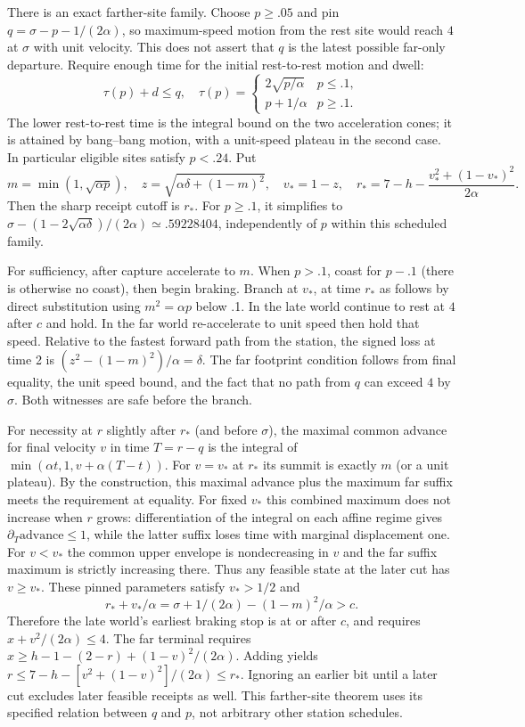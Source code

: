 \documentclass{article}
\begin{document}
There is an exact farther-site family. Choose $p\ge .05$ and pin
$q=\sigma-p-1/(2\alpha)$, so maximum-speed motion from the rest
site would reach $4$ at $\sigma$ with unit velocity. This does
not assert that $q$ is the latest possible far-only departure.
Require enough time for the initial rest-to-rest motion and dwell:
\[
 \tau(p)+d\le q,\quad
 \tau(p)=\begin{cases}2\sqrt{p/\alpha}&p\le .1,\\
 p+1/\alpha&p\ge .1.\end{cases}
\]
The lower rest-to-rest time is the integral bound on the two
acceleration cones; it is attained by bang--bang motion, with a
unit-speed plateau in the second case. In particular eligible
sites satisfy $p<.24$. Put
\[
 m=\min(1,\sqrt{\alpha p}),\quad z=\sqrt{\alpha\delta+(1-m)^2},
 \quad v_*=1-z,\quad
 r_* = 7-h-\frac{v_*^2+(1-v_*)^2}{2\alpha}.
\]
Then the sharp receipt cutoff is $r_*$. For $p\ge .1$, it
simplifies to $\sigma-(1-2\sqrt{\alpha\delta})/(2\alpha)
\simeq.59228404$, independently of $p$ within this scheduled
family.

For sufficiency, after capture accelerate to $m$. When $p>.1$,
coast for $p-.1$ (there is otherwise no coast), then begin
braking. Branch at $v_*$, at time $r_*$ as follows by direct
substitution using $m^2=\alpha p$ below .1. In the late world
continue to rest at $4$ after $c$ and hold. In the far world
re-accelerate to unit speed then hold that speed. Relative to
the fastest forward path from the station, the signed loss at
time 2 is $(z^2-(1-m)^2)/\alpha=\delta$. The far footprint
condition follows from final equality, the unit speed bound, and
the fact that no path from $q$ can exceed $4$ by $\sigma$.
Both witnesses are safe before the branch.

For necessity at $r$ slightly after $r_*$ (and before $\sigma$),
the maximal common advance for final velocity $v$ in time $T=r-q$
is the integral of $\min(\alpha t,1,v+\alpha(T-t))$.
For $v=v_*$ at $r_*$ its summit is exactly $m$ (or a unit plateau).
By the construction, this maximal advance plus the maximum far
suffix meets the requirement at equality. For fixed $v_*$ this
combined maximum does not increase when $r$ grows: differentiation
of the integral on each affine regime gives
$\partial_T \mathrm{advance}\le1$, while the latter suffix loses
time with marginal displacement one. For $v<v_*$ the common
upper envelope is nondecreasing in $v$ and the far suffix
maximum is strictly increasing there. Thus any feasible state
at the later cut has $v\ge v_*$. These pinned parameters satisfy
$v_*>1/2$ and
\[
 r_*+v_*/\alpha=\sigma+1/(2\alpha)-(1-m)^2/\alpha>c .
\]
Therefore the late world's earliest braking stop is at or after
$c$, and requires $x+v^2/(2\alpha)\le4$. The far terminal requires
$x\ge h-1-(2-r)+(1-v)^2/(2\alpha)$. Adding yields
$r\le7-h-[v^2+(1-v)^2]/(2\alpha)\le r_*$.
Ignoring an earlier bit until a later cut excludes later feasible
receipts as well. This farther-site theorem uses its specified
relation between $q$ and $p$, not arbitrary other station schedules.
\end{document}
